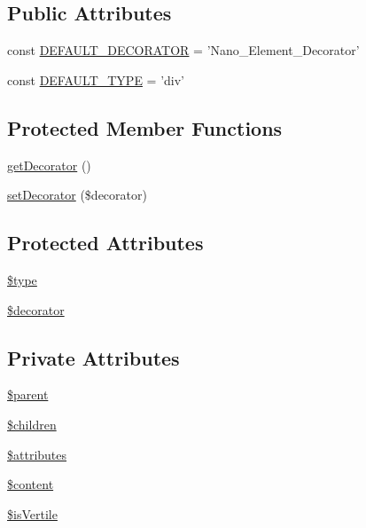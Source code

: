 \subsection*{Public Attributes}
\begin{CompactItemize}
\item 
const \hyperlink{classNano__Element_5eb03c33ce648f7e3d11a361874e56d1}{DEFAULT\_\-DECORATOR} = 'Nano\_\-Element\_\-Decorator'
\item 
const \hyperlink{classNano__Element_3a521fbc08c03c8c11a7476714907d22}{DEFAULT\_\-TYPE} = 'div'
\end{CompactItemize}
\subsection*{Protected Member Functions}
\begin{CompactItemize}
\item 
\hyperlink{classNano__Element_b07b5643230b5c7e38fbafe34b2e832a}{getDecorator} ()
\item 
\hyperlink{classNano__Element_d3ff42c129e9e3ea9c13b837580d2065}{setDecorator} (\$decorator)
\end{CompactItemize}
\subsection*{Protected Attributes}
\begin{CompactItemize}
\item 
\hyperlink{classNano__Element_680d4d2a5b6e3839ea58ce736cd64848}{\$type}
\item 
\hyperlink{classNano__Element_e1baeed35a636493cc00193dc3113575}{\$decorator}
\end{CompactItemize}
\subsection*{Private Attributes}
\begin{CompactItemize}
\item 
\hyperlink{classNano__Element_d2e3a23a2a5609176154dad94e432b49}{\$parent}
\item 
\hyperlink{classNano__Element_8be530ddca7d1d287f1ab65ee4503ee6}{\$children}
\item 
\hyperlink{classNano__Element_ceb605c508e41975e8b34777db94bf91}{\$attributes}
\item 
\hyperlink{classNano__Element_591becd5db8447db67ef6d7bdf9bdd13}{\$content}
\item 
\hyperlink{classNano__Element_a37a31052a00cd0fd144cc0589fb36e2}{\$isVertile}
\end{CompactItemize}


